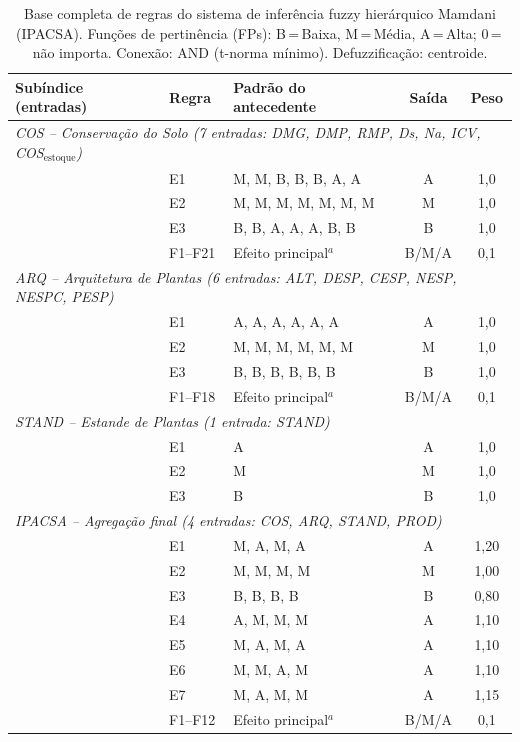\documentclass[12pt]{article}
\begin{document}
\clearpage
\begin{table}[ht]
\centering
\caption{Base completa de regras do sistema de inferência fuzzy hierárquico Mamdani (IPACSA). Funções de pertinência (FPs): B\,=\,Baixa, M\,=\,Média, A\,=\,Alta; 0\,=\,não importa. Conexão: AND (t-norma mínimo). Defuzzificação: centroide.}\label{tab:s2_fuzzy}
\smallskip
\begin{tabular}{p{4.5cm}lp{5cm}cc}
\toprule
Subíndice (entradas) & Regra & Padrão do antecedente & Saída & Peso \\
\midrule
\multicolumn{5}{l}{\textit{COS -- Conservação do Solo (7 entradas: DMG, DMP, RMP, Ds, Na, ICV, COS$_{\text{estoque}}$)}} \\
 & E1 & M, M, B, B, B, A, A & A & 1,0 \\
 & E2 & M, M, M, M, M, M, M & M & 1,0 \\
 & E3 & B, B, A, A, A, B, B & B & 1,0 \\
 & F1--F21 & Efeito principal$^a$ & B/M/A & 0,1 \\
\midrule
\multicolumn{5}{l}{\textit{ARQ -- Arquitetura de Plantas (6 entradas: ALT, DESP, CESP, NESP, NESPC, PESP)}} \\
 & E1 & A, A, A, A, A, A & A & 1,0 \\
 & E2 & M, M, M, M, M, M & M & 1,0 \\
 & E3 & B, B, B, B, B, B & B & 1,0 \\
 & F1--F18 & Efeito principal$^a$ & B/M/A & 0,1 \\
\midrule
\multicolumn{5}{l}{\textit{STAND -- Estande de Plantas (1 entrada: STAND)}} \\
 & E1 & A & A & 1,0 \\
 & E2 & M & M & 1,0 \\
 & E3 & B & B & 1,0 \\
\midrule
\multicolumn{5}{l}{\textit{IPACSA -- Agregação final (4 entradas: COS, ARQ, STAND, PROD)}} \\
 & E1 & M, A, M, A & A & 1,20 \\
 & E2 & M, M, M, M & M & 1,00 \\
 & E3 & B, B, B, B & B & 0,80 \\
 & E4 & A, M, M, M & A & 1,10 \\
 & E5 & M, A, M, A & A & 1,10 \\
 & E6 & M, M, A, M & A & 1,10 \\
 & E7 & M, A, M, M & A & 1,15 \\
 & F1--F12 & Efeito principal$^a$ & B/M/A & 0,1 \\
\bottomrule
\end{tabular}
\smallskip

\end{table}
\end{document}
